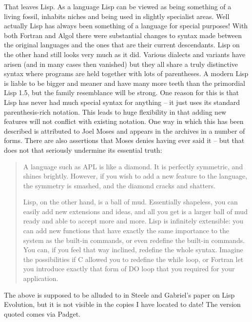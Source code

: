 That leaves Lisp. As a language Lisp can be viewed as being
something of a living fossil, inhabits niches and being used in slightly
specialist areas. Well actually Lisp has always been something of a language
for special purposes! With both Fortran and Algol there were substantial
changes to syntax made between the original languages and the ones 
that are their current descendants. Lisp on the other hand still looks
very much as it did. Various dialects and variants have arisen (and in many
cases then vanished) but they all share a truly distinctive syntax where
programs are held together with lots of parentheses. A modern Lisp
is liable to be bigger and meaner and have many more teeth than the
primordial Lisp 1.5, but the family resemblance will be strong. One reason for
this is that Lisp has never had much special syntax for anything -- it
just uses its standard parenthesis-rich notation. This leads to huge
flexibility in that adding new features will not conflict with existing
notation. One way in which this has been described is attributed to
Joel Moses and appears in the archives in a number of forms. There are
also assertions that Moses denies having ever said it -- but that does not
that seriously undermine its essential truth:
{\em \begin{quotation}
A language such as APL is like a diamond. It is perfectly symmetric,
and shines brightly. However, if you wish to add a new feature to the
language, the symmetry is smashed, and the diamond cracks and shatters.

Lisp, on the other hand, is a ball of mud. Essentially shapeless,
you can easily add new extensions and ideas, and all you get is a
larger ball of mud ready and able to accept more and more.
Lisp is infinitely extensible: you can add new functions that have
exactly the same importance to the system as the built-in commands,
or even redefine the built-in commands. You can, if you feel that
way inclined, redefine the whole syntax. Imagine the possibilities
if C allowed you to redefine the while loop, or Fortran let you
introduce exactly that form of DO loop that you required
for your application.
\end{quotation}}
The above is supposed to be alluded to in Steele and Gabriel's paper
on Lisp Evolution\cite{Evolution}, but it is not visible in the copies
I have located to date! The version quoted comes via Padget\cite{Padget}.


